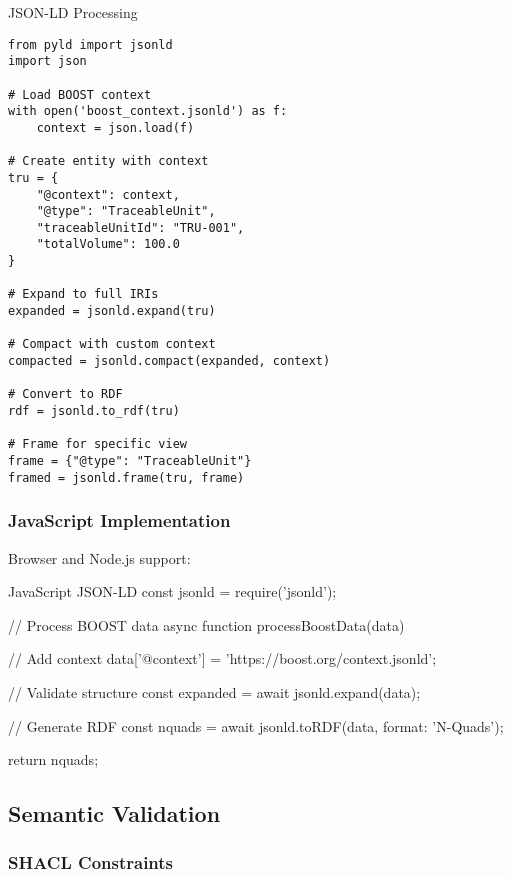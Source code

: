 \begin{pythonexample}{JSON-LD Processing}
\begin{verbatim}
from pyld import jsonld
import json

# Load BOOST context
with open('boost_context.jsonld') as f:
    context = json.load(f)

# Create entity with context
tru = {
    "@context": context,
    "@type": "TraceableUnit",
    "traceableUnitId": "TRU-001",
    "totalVolume": 100.0
}

# Expand to full IRIs
expanded = jsonld.expand(tru)

# Compact with custom context
compacted = jsonld.compact(expanded, context)

# Convert to RDF
rdf = jsonld.to_rdf(tru)

# Frame for specific view
frame = {"@type": "TraceableUnit"}
framed = jsonld.frame(tru, frame)
\end{verbatim}
\end{pythonexample}

\subsubsection{JavaScript Implementation}

Browser and Node.js support:

\begin{jsonexample}{JavaScript JSON-LD}
const jsonld = require('jsonld');

// Process BOOST data
async function processBoostData(data) {
  // Add context
  data['@context'] = 'https://boost.org/context.jsonld';
  
  // Validate structure
  const expanded = await jsonld.expand(data);
  
  // Generate RDF
  const nquads = await jsonld.toRDF(data, {format: 'N-Quads'});
  
  return nquads;
}
\end{jsonexample}

\subsection{Semantic Validation}
\label{sec:semantic-validation}

\subsubsection{SHACL Constraints}

